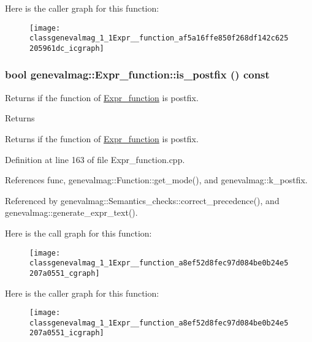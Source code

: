 Here is the caller graph for this function:\nopagebreak
\begin{figure}[H]
\begin{center}
\leavevmode
\texttt{[image: classgenevalmag\_1\_1Expr\_\_function\_af5a16ffe850f268df142c625205961dc\_icgraph]}
\end{center}
\end{figure}


\hypertarget{classgenevalmag_1_1Expr__function_a8ef52d8fec97d084be0b24e5207a0551}{
\subsubsection[{is\_\-postfix}]{\setlength{\rightskip}{0pt plus 5cm}bool genevalmag::Expr\_\-function::is\_\-postfix () const}}
\label{classgenevalmag_1_1Expr__function_a8ef52d8fec97d084be0b24e5207a0551}
Returns if the function of \hyperlink{classgenevalmag_1_1Expr__function}{Expr\_\-function} is postfix. \begin{DoxyReturn}{Returns}

\end{DoxyReturn}
Returns if the function of \hyperlink{classgenevalmag_1_1Expr__function}{Expr\_\-function} is postfix. 

Definition at line 163 of file Expr\_\-function.cpp.



References func, genevalmag::Function::get\_\-mode(), and genevalmag::k\_\-postfix.



Referenced by genevalmag::Semantics\_\-checks::correct\_\-precedence(), and genevalmag::generate\_\-expr\_\-text().



Here is the call graph for this function:\nopagebreak
\begin{figure}[H]
\begin{center}
\leavevmode
\texttt{[image: classgenevalmag\_1\_1Expr\_\_function\_a8ef52d8fec97d084be0b24e5207a0551\_cgraph]}
\end{center}
\end{figure}




Here is the caller graph for this function:\nopagebreak
\begin{figure}[H]
\begin{center}
\leavevmode
\texttt{[image: classgenevalmag\_1\_1Expr\_\_function\_a8ef52d8fec97d084be0b24e5207a0551\_icgraph]}
\end{center}
\end{figure}


